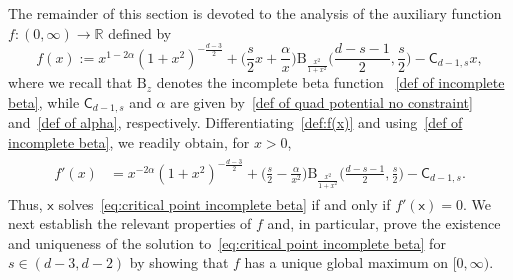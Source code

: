 \documentclass{amsart}
\def\R{\mathbb{R}}
\theoremstyle{plain}
\theoremstyle{remark}
\numberwithin{equation}{section}
\begin{document}
The remainder of this section is devoted to the analysis of the auxiliary function $f:(0,\infty)\to\R$ defined by
\begin{equation}\label{def:f(x)}
    f(x) := x^{1-2\alpha}(1+x^2)^{-\frac{d-3}{2}} +\Big(\frac{s}{2}x +\frac{\alpha}{x}\Big) \mathrm{B}_{\frac{x^2}{1+x^2}}\Big(\frac{d-s-1}{2}, \frac{s}{2}\Big)-\mathsf{C}_{d-1, s}x, 
\end{equation}
where we recall that $\mathrm{B}_z$ denotes the incomplete beta function ~\eqref{def of incomplete beta}, while $\mathsf{C}_{d-1,s}$ and $\alpha$ are given by~\eqref{def of quad potential no constraint} and~\eqref{def of alpha}, respectively. 
Differentiating~\eqref{def:f(x)} and using~\eqref{def of incomplete beta},
we readily obtain, for $x>0$, 
\begin{align}
\label{eq:f'(x)}
\begin{split}
    f'(x) 
    &= x^{-2\alpha}(1+x^2)^{-\frac{d-3}{2}} + \Big(\frac{s}{2}-\frac{\alpha}{x^2}\Big)\mathrm{B}_{\frac{x^2}{1+x^2}}\Big(\frac{d-s-1}{2},\frac{s}{2}\Big)-\mathsf{C}_{d-1,s}.
\end{split}
\end{align}
Thus, $\mathsf{x}$ solves~\eqref{eq:critical point incomplete beta} if and only if $f'(\mathsf{x})=0$. 
We next establish the relevant properties of $f$ and, in particular, prove the existence and uniqueness
of the solution to~\eqref{eq:critical point incomplete beta} for
$s\in(d-3,d-2)$ by showing that $f$ has a unique global maximum on
$[0,\infty)$. 

 
\end{document}

